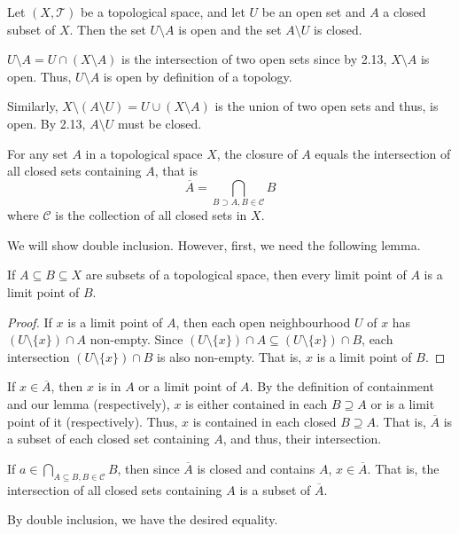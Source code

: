 \documentclass[12 pt, letterpaper]{hmcpset}
\begin{document}
\begin{problem}[2.14]
	Let $(X, \mathcal{T})$ be a topological space, and let $U$ be an open set and $A$ a closed subset of $X$. Then the set $U \setminus A$ is open and the set $A \setminus U$ is closed.
\end{problem}

\begin{solution}
	$U \setminus A = U \cap (X \setminus A)$ is the intersection of two open sets since by 2.13, $X \setminus A$ is open. Thus, $U \setminus A$ is open by definition of a topology.

	Similarly, $X \setminus (A \setminus U) = U \cup (X \setminus A)$ is the union of two open sets and thus, is open. By 2.13, $A \setminus U$ must be closed.
\end{solution}

\pagebreak

\begin{problem}[2.20]
	For any set $A$ in a topological space $X$, the closure of $A$ equals the intersection of all closed sets containing $A$, that is
	\[
		\overline{A} = \bigcap_{B \supset A, B \in \mathcal{C}} B
	\]
	where $\mathcal{C}$ is the collection of all closed sets in $X$.
\end{problem}

\begin{solution}
	We will show double inclusion. However, first, we need the following lemma.

	\begin{lemma}
		If $A \subseteq B \subseteq X$ are subsets of a topological space, then every limit point of $A$ is a limit point of $B$.
	\end{lemma}

	\begin{proof}
		If $x$ is a limit point of $A$, then each open neighbourhood $U$ of $x$ has $(U \setminus \{ x \}) \cap A$ non-empty. Since $(U \setminus \{ x \}) \cap A \subseteq (U \setminus \{ x \}) \cap B$, each intersection $(U \setminus \{ x \}) \cap B$ is also non-empty. That is, $x$ is a limit point of $B$.
	\end{proof}

	If $x \in \overline{A}$, then $x$ is in $A$ or a limit point of $A$. By the definition of containment and our lemma (respectively), $x$ is either contained in each $B \supseteq A$ or is a limit point of it (respectively). Thus, $x$ is contained in each closed $B \supseteq A$. That is, $\overline{A}$ is a subset of each closed set containing $A$, and thus, their intersection.

	If $a \in \bigcap_{A \subseteq B, B \in \mathcal{C}} B$, then since $\overline{A}$ is closed and contains $A$, $x \in \overline{A}$. That is, the intersection of all closed sets containing $A$ is a subset of $\overline{A}$.

	By double inclusion, we have the desired equality.
\end{solution}
\end{document}
